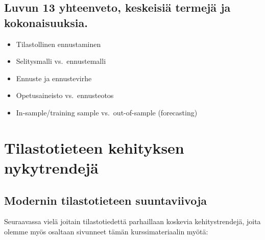 \documentclass[
]{book}
\providecommand{\tightlist}{%
  \setlength{\itemsep}{0pt}\setlength{\parskip}{0pt}}
\begin{document}
\hypertarget{luvun-13-yhteenveto-keskeisiuxe4-termejuxe4-ja-kokonaisuuksia.}{%
\section{Luvun 13 yhteenveto, keskeisiä termejä ja kokonaisuuksia.}\label{luvun-13-yhteenveto-keskeisiuxe4-termejuxe4-ja-kokonaisuuksia.}}

\begin{itemize}
\tightlist
\item
  Tilastollinen ennustaminen
\item
  Selitysmalli vs.~ennustemalli
\item
  Ennuste ja ennustevirhe
\item
  Opetusaineisto vs.~ennusteotos
\item
  In-sample/training sample vs.~out-of-sample (forecasting)
\end{itemize}


\hypertarget{luku14}{%
\chapter{Tilastotieteen kehityksen nykytrendejä}\label{luku14}}

\hypertarget{modernin-tilastotieteen-suuntaviivoja}{%
\section{Modernin tilastotieteen suuntaviivoja}\label{modernin-tilastotieteen-suuntaviivoja}}

Seuraavassa vielä joitain tilastotiedettä parhaillaan koskevia kehitystrendejä, joita olemme myös osaltaan sivunneet tämän kurssimateriaalin myötä:
\end{document}
